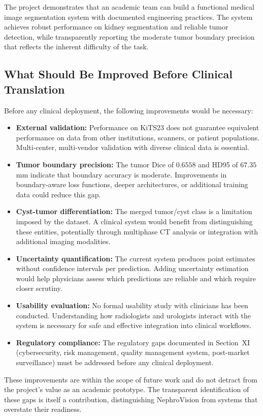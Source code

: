 The project demonstrates that an academic team can build a functional medical image segmentation system with documented engineering practices. The system achieves robust performance on kidney segmentation and reliable tumor detection, while transparently reporting the moderate tumor boundary precision that reflects the inherent difficulty of the task.

\subsection{What Should Be Improved Before Clinical Translation}

Before any clinical deployment, the following improvements would be necessary:

\begin{itemize}
    \item \textbf{External validation:} Performance on KiTS23 does not guarantee equivalent performance on data from other institutions, scanners, or patient populations. Multi-center, multi-vendor validation with diverse clinical data is essential.
    \item \textbf{Tumor boundary precision:} The tumor Dice of $0.6558$ and HD95 of $67.35$ mm indicate that boundary accuracy is moderate. Improvements in boundary-aware loss functions, deeper architectures, or additional training data could reduce this gap.
    \item \textbf{Cyst-tumor differentiation:} The merged tumor/cyst class is a limitation imposed by the dataset. A clinical system would benefit from distinguishing these entities, potentially through multiphase CT analysis or integration with additional imaging modalities.
    \item \textbf{Uncertainty quantification:} The current system produces point estimates without confidence intervals per prediction. Adding uncertainty estimation would help physicians assess which predictions are reliable and which require closer scrutiny.
    \item \textbf{Usability evaluation:} No formal usability study with clinicians has been conducted. Understanding how radiologists and urologists interact with the system is necessary for safe and effective integration into clinical workflows.
    \item \textbf{Regulatory compliance:} The regulatory gaps documented in Section~XI (cybersecurity, risk management, quality management system, post-market surveillance) must be addressed before any clinical deployment.
\end{itemize}

These improvements are within the scope of future work and do not detract from the project's value as an academic prototype. The transparent identification of these gaps is itself a contribution, distinguishing NephroVision from systems that overstate their readiness.
